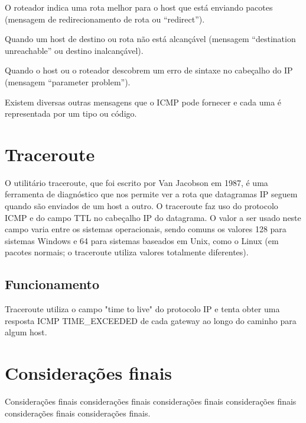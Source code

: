 \documentclass[article,12pt,oneside,a4paper,english,brazil,sumario=tradicional]{abntex2}
\begin{document}
O roteador indica uma rota melhor para o host que está enviando pacotes (mensagem de redirecionamento de rota ou “redirect”).

Quando um host de destino ou rota não está alcançável (mensagem “destination unreachable” ou destino inalcançável).

Quando o host ou o roteador descobrem um erro de sintaxe no cabeçalho do IP (mensagem “parameter problem”). 

Existem diversas outras mensagens que o ICMP pode fornecer e cada uma é representada por um tipo ou código.

 
 \section{Traceroute}
 O utilitário traceroute, que foi escrito por Van Jacobson em 1987, é uma ferramenta de diagnóstico que nos permite ver a rota que datagramas IP seguem quando são enviados de um host a outro. O traceroute faz uso do protocolo ICMP e do campo TTL no cabeçalho IP do datagrama. O valor a ser usado neste campo varia entre os sistemas operacionais, sendo comuns os valores 128 para sistemas Windows e 64 para sistemas baseados em Unix, como o Linux (em pacotes normais; o traceroute utiliza valores totalmente diferentes).
 
 \subsection{Funcionamento }
 Traceroute  utiliza o campo "time to live" do protocolo IP e tenta obter uma resposta ICMP TIME\_EXCEEDED de cada gateway ao longo do caminho para algum host.


\section{Considera\c c\~oes finais}

Considera\c c\~oes finais considera\c c\~oes finais considera\c c\~oes finais considera\c c\~oes finais considera\c c\~oes finais considera\c c\~oes finais.

\renewcommand{\bibsection}{\section*{REFER\^ENCIAS BIBLIOGR\'AFICAS}}


\end{document}
